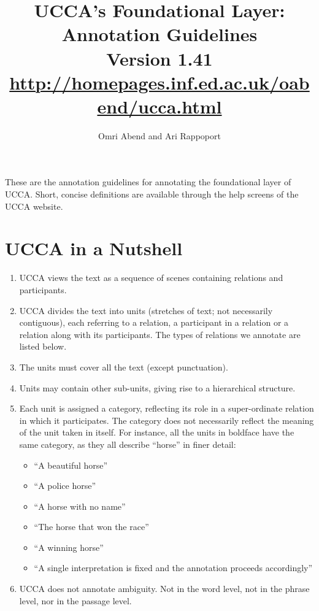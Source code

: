 \documentclass[11pt]{article}
\title{UCCA's Foundational Layer:  Annotation 	Guidelines \\
\normalsize{Version 1.41} \\
\url{http://homepages.inf.ed.ac.uk/oabend/ucca.html}}
\author{
Omri Abend and Ari Rappoport
}
\begin{document}
\maketitle

These are the annotation guidelines for annotating the foundational layer of UCCA. Short, concise definitions are available through the help screens of the UCCA website.

\section*{\large UCCA in a Nutshell}

\begin{enumerate}

\item
UCCA views the text as a sequence of scenes containing relations and participants.
\item
UCCA divides the text into units (stretches of text; not necessarily contiguous), each referring to a relation, a participant in a relation or a relation along with its participants. The types of relations we annotate are listed below.
\item
The units must cover all the text (except punctuation).
\item
Units may contain other sub-units, giving rise to a hierarchical structure.
\item
Each unit is assigned a category, reflecting its role in a super-ordinate relation in which it participates. The category does not necessarily reflect the meaning of the unit taken in itself. For instance, all the units in boldface have the same category, as they all describe ``horse'' in finer detail:

\begin{itemize}
\item
``A beautiful horse''
\item
``A police horse''
\item
``A horse with no name''
\item
``The horse that won the race''
\item
``A winning horse''
\item
``A single interpretation is fixed and the annotation proceeds accordingly''
\end{itemize}

\item
UCCA does not annotate ambiguity. Not in the word level, not in the phrase level, nor in the passage level.


\end{enumerate}
\end{document}
